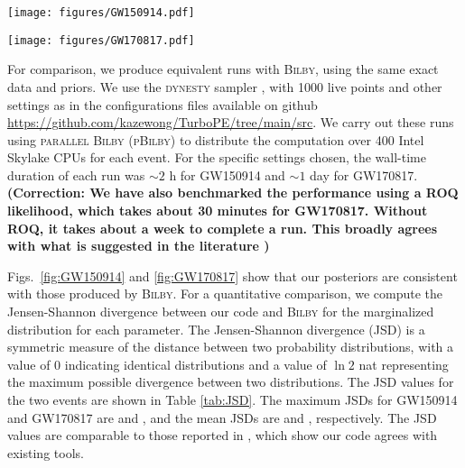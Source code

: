\documentclass[twocolumn]{aastex631}
\newcommand{\corr}[1]{\textbf{\color{pyRed}(Correction: #1)}}
\begin{document}
\begin{figure*}
    \texttt{[image: figures/GW150914.pdf]}
    \caption{
      GW150914 posterior computed by our code (blue) and \textsc{Bilby} (gray).
    }
    \label{fig:GW150914}
\end{figure*}

\begin{figure*}
\texttt{[image: figures/GW170817.pdf]}
\caption{
    GW170817 posterior computed by our code (blue) and \textsc{Bilby} (gray).
}
\label{fig:GW170817}
\end{figure*}

For comparison, we produce equivalent runs with \textsc{Bilby}, using the same
exact data and priors.  We use the \textsc{dynesty} sampler
\citep{2020MNRAS.493.3132S,dynesty}, with 1000 live points and other settings as
in the configurations files available on github
\url{https://github.com/kazewong/TurboPE/tree/main/src}.  We carry out these
runs using \textsc{parallel Bilby} (\textsc{pBilby}) \citep{Smith:2019ucc} to
distribute the computation over 400 Intel Skylake CPUs for each event. For the
specific settings chosen, the wall-time duration of each run was ${\sim}2$ h for
GW150914 and ${\sim}1$ day for GW170817. \corr{We have also benchmarked the
performance using a ROQ likelihood, which takes about 30 minutes for GW170817.
Without ROQ, it takes about a week to complete a run. This broadly agrees with
what is suggested in the literature \cite{Smith:2016qas}}

Figs.~\ref{fig:GW150914} and \ref{fig:GW170817} show that our posteriors are
consistent with those produced by \textsc{Bilby}.  For a quantitative
comparison, we compute the Jensen-Shannon divergence between our code and
\textsc{Bilby} for the marginalized distribution for each parameter. The
Jensen-Shannon divergence (JSD) is a symmetric measure of the distance between
two probability distributions, with a value of 0 indicating identical
distributions and a value of $\ln{2}$ nat representing the maximum
possible divergence between two distributions. The JSD values for the two events
are shown in Table \ref{tab:JSD}. The maximum JSDs for GW150914 and GW170817 are
\jsdMaxBBH and \jsdMaxBNS, and the mean JSDs are \jsdAvgBBH and \jsdAvgBNS,
respectively. The JSD values are comparable to those reported in
\cite{Romero-Shaw:2020owr}, which show our code agrees with existing tools.

\begin{table}[hbt!]
    \begin{center}
    \caption{JSD values for the marginalized distribution of each parameter for
    GW150914 and GW170817 between our code and \textsc{Bilby}. The bold values
    indicate the parameters with the largest JSD.}
    \label{tab:JSD}
    \end{center}
\end{table}
\end{document}
